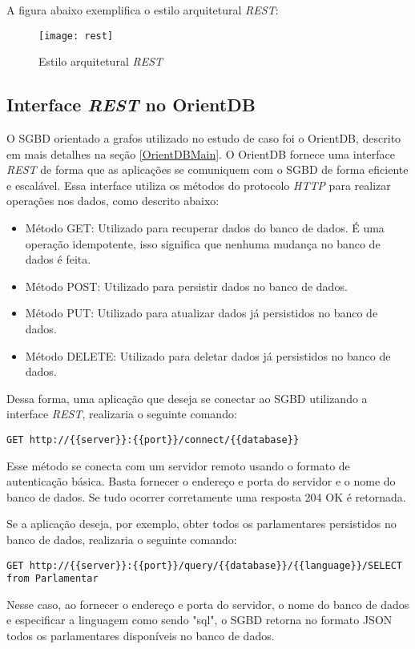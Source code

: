 	A figura abaixo exemplifica o estilo arquitetural \textit{REST}:

\begin{figure}[h]
	\centering
    \texttt{[image: rest]}
    \caption{Estilo arquitetural \textit{REST}}
    \label{fig:rest-style}
\end{figure}


\subsection{Interface \textit{REST} no OrientDB}
	O SGBD orientado a grafos utilizado no estudo de caso foi o OrientDB, descrito em mais detalhes na seção \ref{OrientDBMain}. O OrientDB fornece uma interface \textit{REST} de forma que as aplicações se comuniquem com o SGBD de forma eficiente e escalável. Essa interface utiliza os métodos do protocolo \textit{HTTP} para realizar operações nos dados, como descrito abaixo:
	
\begin{itemize}
	\item Método GET: Utilizado para recuperar dados do banco de dados. É uma operação idempotente, isso significa que nenhuma mudança no banco de dados é feita.
	\item Método POST: Utilizado para persistir dados no banco de dados.
	\item Método PUT: Utilizado para atualizar dados já persistidos no banco de dados.
	\item Método DELETE: Utilizado para deletar dados já persistidos no banco de dados.
\end{itemize}

	Dessa forma, uma aplicação que deseja se conectar ao SGBD utilizando a interface \textit{REST}, realizaria o seguinte comando: 
	
\begin{lstlisting}
GET http://{{server}}:{{port}}/connect/{{database}}
\end{lstlisting}

	Esse método se conecta com um servidor remoto usando o formato de autenticação básica. Basta fornecer o endereço e porta do servidor e o nome do banco de dados. Se tudo ocorrer corretamente uma resposta 204 OK é retornada.
	
	Se a aplicação deseja, por exemplo, obter todos os parlamentares persistidos no banco de dados, realizaria o seguinte comando:
	
\begin{lstlisting}
GET http://{{server}}:{{port}}/query/{{database}}/{{language}}/SELECT 
from Parlamentar
\end{lstlisting}

	Nesse caso, ao fornecer o endereço e porta do servidor, o nome do banco de dados e especificar a linguagem como sendo "sql", o SGBD retorna no formato JSON todos os parlamentares disponíveis no banco de dados.
